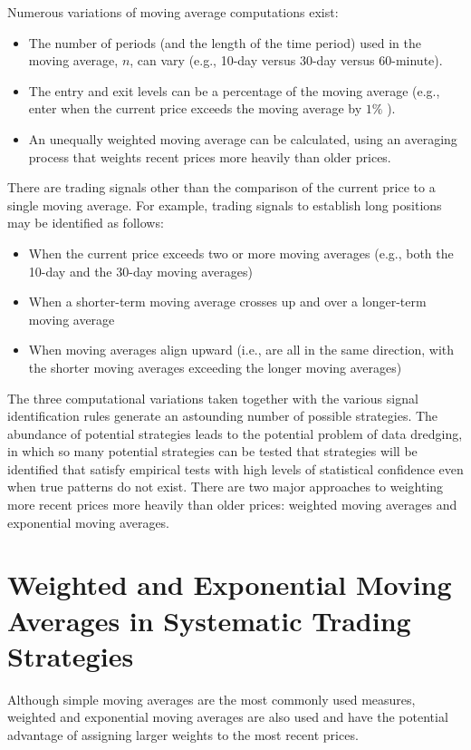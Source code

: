 \documentclass[11pt]{article}
\begin{document}
Numerous variations of moving average computations exist:

\begin{itemize}
  \item The number of periods (and the length of the time period) used in the moving average, $n$, can vary (e.g., 10-day versus 30-day versus 60-minute).
  \item The entry and exit levels can be a percentage of the moving average (e.g., enter when the current price exceeds the moving average by $1 \%$ ).
  \item An unequally weighted moving average can be calculated, using an averaging process that weights recent prices more heavily than older prices.
\end{itemize}

There are trading signals other than the comparison of the current price to a single moving average. For example, trading signals to establish long positions may be identified as follows:

\begin{itemize}
  \item When the current price exceeds two or more moving averages (e.g., both the 10-day and the 30-day moving averages)
  \item When a shorter-term moving average crosses up and over a longer-term moving average
  \item When moving averages align upward (i.e., are all in the same direction, with the shorter moving averages exceeding the longer moving averages)
\end{itemize}

The three computational variations taken together with the various signal identification rules generate an astounding number of possible strategies. The abundance of potential strategies leads to the potential problem of data dredging, in which so many potential strategies can be tested that strategies will be identified that satisfy empirical tests with high levels of statistical confidence even when true patterns do not exist. There are two major approaches to weighting more recent prices more heavily than older prices: weighted moving averages and exponential moving averages.

\section*{Weighted and Exponential Moving Averages in Systematic Trading Strategies}
Although simple moving averages are the most commonly used measures, weighted and exponential moving averages are also used and have the potential advantage of assigning larger weights to the most recent prices.
\end{document}
